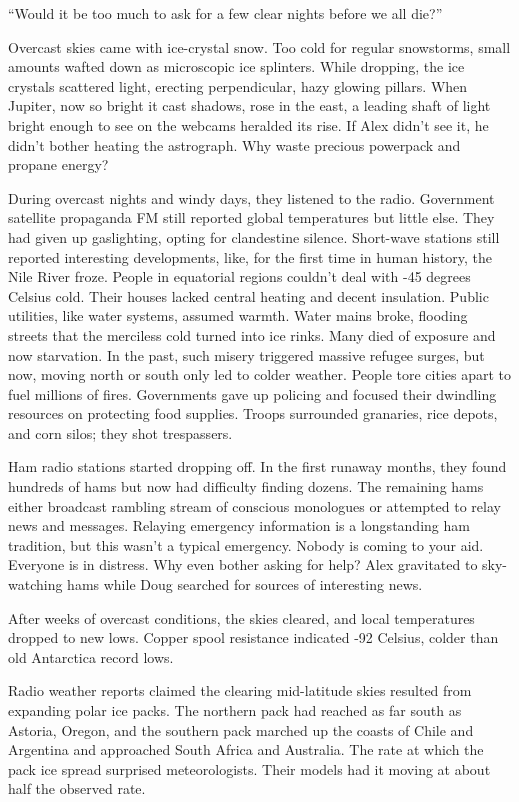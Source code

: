 ``Would it be too much to ask for a few clear nights before we all
die?''

Overcast skies came with ice-crystal snow. Too cold for regular
snowstorms, small amounts wafted down as microscopic ice splinters.
While dropping, the ice crystals scattered light, erecting
perpendicular, hazy glowing pillars. When Jupiter, now so bright it cast
shadows, rose in the east, a leading shaft of light bright enough to see
on the webcams heralded its rise. If Alex didn't see it, he didn't
bother heating the astrograph. Why waste precious powerpack and propane
energy?

During overcast nights and windy days, they listened to the radio.
Government satellite propaganda FM still reported global temperatures
but little else. They had given up gaslighting, opting for clandestine
silence. Short-wave stations still reported interesting developments,
like, for the first time in human history, the Nile River froze. People
in equatorial regions couldn't deal with -45 degrees Celsius cold. Their
houses lacked central heating and decent insulation. Public utilities,
like water systems, assumed warmth. Water mains broke, flooding streets
that the merciless cold turned into ice rinks. Many died of exposure and
now starvation. In the past, such misery triggered massive refugee
surges, but now, moving north or south only led to colder weather.
People tore cities apart to fuel millions of fires. Governments gave up
policing and focused their dwindling resources on protecting food
supplies. Troops surrounded granaries, rice depots, and corn silos; they
shot trespassers.

Ham radio stations started dropping off. In the first runaway months,
they found hundreds of hams but now had difficulty finding dozens. The
remaining hams either broadcast rambling stream of conscious monologues
or attempted to relay news and messages. Relaying emergency information
is a longstanding ham tradition, but this wasn't a typical emergency.
Nobody is coming to your aid. Everyone is in distress. Why even bother
asking for help? Alex gravitated to sky-watching hams while Doug
searched for sources of interesting news.

After weeks of overcast conditions, the skies cleared, and local
temperatures dropped to new lows. Copper spool resistance indicated -92
Celsius, colder than old Antarctica record lows.

Radio weather reports claimed the clearing mid-latitude skies resulted
from expanding polar ice packs. The northern pack had reached as far
south as Astoria, Oregon, and the southern pack marched up the coasts of
Chile and Argentina and approached South Africa and Australia. The rate
at which the pack ice spread surprised meteorologists. Their models had
it moving at about half the observed rate.

